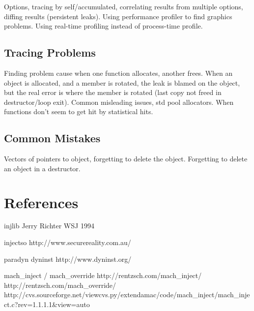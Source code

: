 \documentclass[10pt,a4paper,twocolumn]{article}
\begin{document}
Options, tracing by self/accumulated, correlating results from
multiple options, diffing results (persistent leaks).  Using
performance profiler to find graphics problems.  Using real-time
profiling instead of process-time profile.

\subsection{Tracing Problems}

Finding problem cause when one function allocates, another frees.
When an object is allocated, and a member is rotated, the leak is
blamed on the object, but the real error is where the member is
rotated (last copy not freed in destructor/loop exit).  Common
misleading issues, std pool allocators.  When functions don't seem to
get hit by statistical hits.

\subsection{Common Mistakes}

Vectors of pointers to object, forgetting to delete the object.
Forgetting to delete an object in a destructor.

\section{References}
\begin{thebibliography}{9}
  injlib Jerry Richter WSJ 1994

  injectso http://www.securereality.com.au/

  paradyn dyninst http://www.dyninst.org/

  mach\_inject / mach\_override
  http://rentzsch.com/mach\_inject/
  http://rentzsch.com/mach\_override/
  http://cvs.sourceforge.net/viewcvs.py/extendamac/code/mach\_inject/mach\_inject.c?rev=1.1.1.1\&view=auto

\end{thebibliography}
\end{document}
